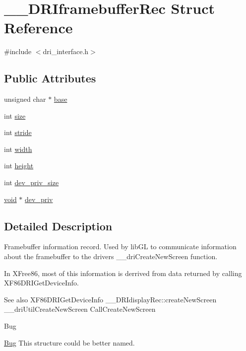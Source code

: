 \hypertarget{struct_____d_r_iframebuffer_rec}{}\section{\+\_\+\+\_\+\+D\+R\+Iframebuffer\+Rec Struct Reference}
\label{struct_____d_r_iframebuffer_rec}


{\ttfamily \#include $<$dri\+\_\+interface.\+h$>$}

\subsection*{Public Attributes}
\begin{DoxyCompactItemize}
\item 
unsigned char $\ast$ \hyperlink{struct_____d_r_iframebuffer_rec_ad4b7d037cf68bf62da49568e6826a2d6}{base}
\item 
int \hyperlink{struct_____d_r_iframebuffer_rec_aa3a4d320b15693103d593499abce5b08}{size}
\item 
int \hyperlink{struct_____d_r_iframebuffer_rec_a2889cbb92d1327c5bebb4cacbe9f6774}{stride}
\item 
int \hyperlink{struct_____d_r_iframebuffer_rec_a9b92fd71279bc61c4d58d88a8b06425b}{width}
\item 
int \hyperlink{struct_____d_r_iframebuffer_rec_aae5cb6f3fb0d56e7a8989bcb2a2d3761}{height}
\item 
int \hyperlink{struct_____d_r_iframebuffer_rec_a0bfbde5e050baa8aa3450a60ce51a85d}{dev\+\_\+priv\+\_\+size}
\item 
\hyperlink{_s_d_l__opengles2__gl2ext_8h_ae5d8fa23ad07c48bb609509eae494c95}{void} $\ast$ \hyperlink{struct_____d_r_iframebuffer_rec_af315b382c3a95a2acbddd5ed8157bfad}{dev\+\_\+priv}
\end{DoxyCompactItemize}


\subsection{Detailed Description}
Framebuffer information record. Used by lib\+GL to communicate information about the framebuffer to the driver\textquotesingle{}s {\ttfamily \+\_\+\+\_\+dri\+Create\+New\+Screen} function.

In X\+Free86, most of this information is derrived from data returned by calling {\ttfamily X\+F86\+D\+R\+I\+Get\+Device\+Info}.

\begin{DoxySeeAlso}{See also}
X\+F86\+D\+R\+I\+Get\+Device\+Info \+\_\+\+\_\+\+D\+R\+Idisplay\+Rec\+::create\+New\+Screen \+\_\+\+\_\+dri\+Util\+Create\+New\+Screen Call\+Create\+New\+Screen
\end{DoxySeeAlso}
\begin{DoxyRefDesc}{Bug}
\item[\hyperlink{bug__bug000001}{Bug}]This structure could be better named. \end{DoxyRefDesc}


